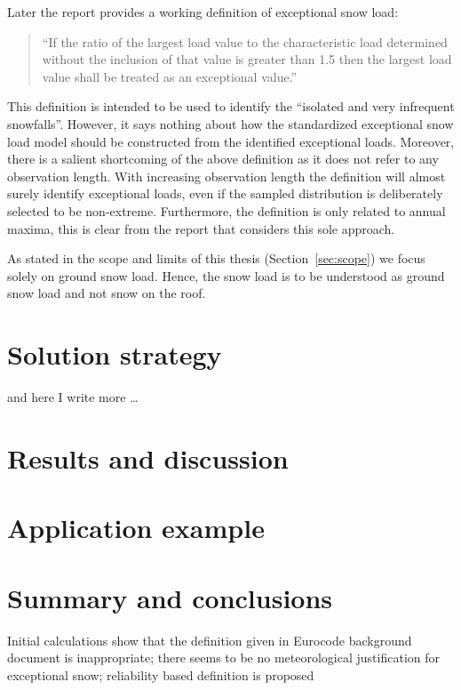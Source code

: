 Later the report provides a working definition of exceptional snow load:
\begin{quote}
	``If the ratio of the largest load value to the characteristic load determined without the inclusion of that value is greater than 1.5 then the largest load value shall be treated as an exceptional value.''
\end{quote}

This definition is intended to be used to identify the ``isolated and very infrequent snowfalls''. However, it says nothing about how the standardized exceptional snow load model should be constructed from the identified exceptional loads. Moreover, there is a salient shortcoming of the above definition as it does not refer to any observation length. With increasing observation length the definition will almost surely identify exceptional loads, even if the sampled distribution is deliberately selected to be non-extreme. Furthermore, the definition is only related to annual maxima, this is clear from the report that considers this sole approach.

As stated in the scope and limits of this thesis (Section~\ref{sec:scope}) we focus solely on ground snow load. Hence, the snow load is to be understood as ground snow load and not snow on the roof.


\section{Solution strategy}
and here I write more \dots

\section{Results and discussion}

\section{Application example}

\section{Summary and conclusions}

Initial calculations show that the definition given in Eurocode background document is inappropriate; there seems to be no meteorological justification for exceptional snow; reliability based definition is proposed

